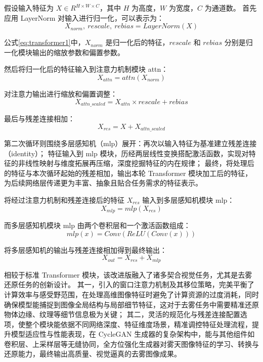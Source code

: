 假设输入特征为 $X \in R^{H \times W \times C} $，其中 $H$ 为高度，$W$ 为宽度，$C$ 为通道数。
首先应用 LayerNorm 对输入进行归一化，可以表示为：
\begin{equation}
    \label{eq:transformer1}
    X_{norm},\ rescale,\ rebias = LayerNorm(X)
\end{equation}

公式\ref{eq:transformer1}中，$X_{norm}$ 是归一化后的特征，$rescale$ 和 $rebias$ 分别是归一化模块输出的缩放参数和偏置参数。

然后将归一化后的特征输入到注意力机制模块 attn：
\begin{equation}
    X_{attn} = attn(X_{norm})
\end{equation}

对注意力输出进行缩放和偏置调整：
\begin{equation}
    X_{attn\_scaled} = X_{attn} \times rescale + rebias
\end{equation}

最后与残差连接相加：
\begin{equation}
    X_{res} = X + X_{attn\_scaled}
\end{equation}

第二次循环则围绕多层感知机（mlp）展开：再次以输入特征为基准建立残差连接（identity）；
特征输入到 mlp 模块，历经两层线性变换搭配激活函数，实现对特征的非线性映射与维度拓展再压缩，深度挖掘特征的内在规律；
最终，将处理后的特征与本次循环起始的残差相加，输出本轮 Transformer 模块加工后的特征，为后续网络层传递更为丰富、抽象且贴合任务需求的特征表示。

将经过注意力机制和残差连接后的特征 $X_{res}$ 输入到多层感知机模块 mlp：
\begin{equation}
    X_{mlp} = mlp(X_{res})
\end{equation}

而多层感知机模块 mlp 由两个卷积层和一个激活函数组成：
\begin{equation}
    mlp(x) = Conv(ReLU(Conv(x)))
\end{equation}

将多层感知机的输出与残差连接相加得到最终输出：
\begin{equation}
    X_{out} = X_{res} + X_{mlp}
\end{equation}

相较于标准 Transformer 模块，该改进版融入了诸多契合视觉任务，尤其是去雾还原任务的创新设计。
其一，引入的窗口注意力机制及其移位策略，完美平衡了计算效率与感受野范围，在处理高维图像特征时避免了计算资源的过度消耗，同时确保模型能捕捉到图像全局结构与局部细节特征，这对于去雾任务中需要精准还原物体边缘、纹理等细节信息极为关键；
其二，灵活的规范化与残差连接配置选项，使整个模块能依据不同网络深度、特征维度场景，精准调控特征处理流程，提升模型适应性与性能表现，在 CycleGAN 生成器的复杂架构中，能与其他组件如卷积层、上采样层等无缝协同，全方位强化生成器对雾天图像特征的学习、转换与还原能力，最终输出高质量、视觉逼真的去雾图像成果。

